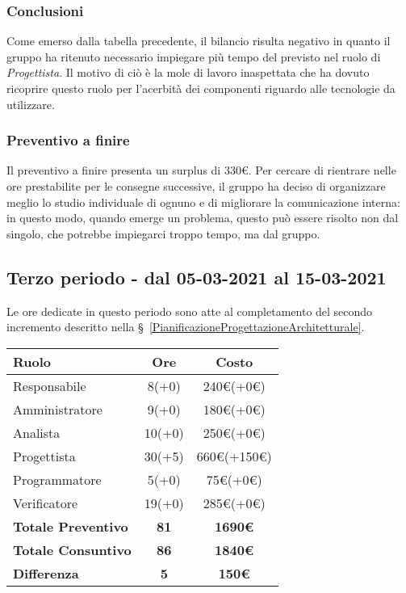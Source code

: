 {{{{\subsubsection{Conclusioni}
Come emerso dalla tabella precedente, il bilancio risulta negativo in quanto il gruppo ha ritenuto necessario impiegare più tempo del previsto nel ruolo di \textit{Progettista}. Il motivo di ciò è la mole di lavoro inaspettata che ha dovuto ricoprire questo ruolo per l'acerbità dei componenti riguardo alle tecnologie da utilizzare.

\subsubsection{Preventivo a finire}
Il preventivo a finire presenta un surplus di 330\euro. Per cercare di rientrare nelle ore prestabilite per le consegne successive, il gruppo ha deciso di organizzare meglio lo studio individuale di ognuno e di migliorare la comunicazione interna: in questo modo, quando emerge un problema, questo può essere risolto non dal singolo, che potrebbe impiegarci troppo tempo, ma dal gruppo.

\subsection{Terzo periodo - dal 05-03-2021 al 15-03-2021}\label{ConsuntivoPeriodoDiProgettazioneArchitetturaleTechnologyBaselineTerzoIncremento}

Le ore dedicate in questo periodo sono atte al completamento del secondo incremento descritto nella \S~\ref{PianificazioneProgettazioneArchitetturale}.

\quad
\def\tabularxcolumn#1{m{#1}}
{
	\begin{center}
		\renewcommand{\arraystretch}{1.4}
		\begin{tabularx}{10cm}{|X|c|c|}
			\hline
			\rowcolor{airforceblue}
			\textbf{Ruolo} & \textbf{Ore} & \textbf{Costo}\\
			\hline
			Responsabile & 8(+0) & 240\euro(+0\euro)\\
			\hline
			Amministratore & 9(+0) & 180\euro(+0\euro)\\
			\hline
			Analista & 10(+0) & 250\euro(+0\euro)\\
			\hline
			Progettista & 30(+5) & 660\euro(+150\euro)\\
			\hline
			Programmatore & 5(+0) & 75\euro(+0\euro)\\
			\hline
			Verificatore & 19(+0) & 285\euro(+0\euro)\\
			\hline
			\textbf{Totale Preventivo} & \textbf{81} & \textbf{1690\euro}\\
			\hline
			\textbf{Totale Consuntivo} & \textbf{86} & \textbf{1840\euro}\\
			\hline
			\textbf{Differenza} & \textbf{5} & \textbf{150\euro}
		\end{tabularx}
	\end{center}

}}}}}
